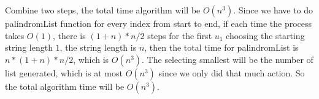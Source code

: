 \documentclass[11pt]{article}
\begin{document}
\begin{solution}
\begin{enumerate}
\begin{itemize}
        \end{itemize}
    Combine two steps, the total time algorithm will be $O(n^3)$. Since we have to do palindromList function for every index from start to end, if each time the process takes $O(1)$, there is $(1+n)*n/2$ steps for the first $u_1$ choosing the starting string length $1$, the string length is $n$, then the total time for palindromList is $n * (1+n)*n/2$, which is $O(n^3)$. The selecting smallest will be the number of list generated, which is at most $O(n^3)$ since we only did that much action. So the total algorithm time will be $O(n^3)$.
\end{enumerate}
\end{solution}
\end{document}

